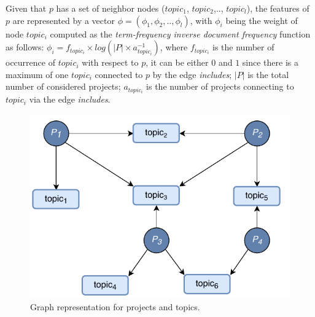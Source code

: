 Given that $p$ has a set of neighbor nodes ($topic_{1}$, $topic_{2}$,.., $topic_{l}$), the features of $p$ are represented by a vector $\phi=(\phi_{1},\phi_{2},..,\phi_{l})$, with $\phi_{i}$ being the weight of node $topic_{i}$ computed as the \emph{term-frequency inverse document frequency} function as follows: $\phi_{i} = f_{topic_{i}} \times log( \left | P \right | \times a_{topic_{i}}^{-1} )$, where $f_{topic_{i}}$ is the number of occurrence of $topic_{i}$ with respect to $p$, it can be either $0$ and $1$ since there is a maximum of one $topic_{i}$ connected to $p$ by the edge \emph{includes}; $\left | P \right |$ is the total number of considered projects; $a_{topic_{i}}$ is the number of projects connecting to $topic_{i}$ via the edge \emph{includes}.
\begin{figure}[t!]
\centering
\includegraphics[width=0.8\columnwidth]{figs/graphCFtop.pdf}
\caption{Graph representation for projects and topics.}
\label{fig:Graph}
\end{figure}
